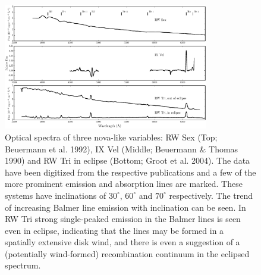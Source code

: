 \documentclass[preprint, a4paper, 11pt]{aastex}
\begin{document}



\begin{figure}	%
\centering
\includegraphics[width=0.8\textwidth]{figures/fig1.eps}
\caption{Optical spectra of three nova-like variables: 
RW Sex (Top; Beuermann et al. 1992),
IX Vel (Middle; Beuermann \& Thomas 1990)
and RW Tri in eclipse (Bottom; Groot et al. 2004).
The data have been digitized from the respective publications and a few of the more
prominent emission and absorption lines are marked. 
These systems have inclinations of $30^\circ$, $60^\circ$ and $70^\circ$ 
respectively.
The trend of increasing Balmer line emission with inclination can be seen.
In RW Tri strong single-peaked emission in the Balmer lines is seen even
in eclipse, indicating that the lines may be formed in a spatially extensive disk wind, and there is even a suggestion
of a (potentially wind-formed) recombination continuum in the eclipsed spectrum.}
\label{novalikes}
\end{figure}
\end{document}
